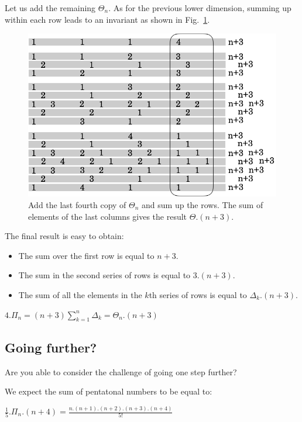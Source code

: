 Let us add the remaining $\Theta_n$.
As for the previous lower dimension, summing up within each row leads to an invariant as shown in Fig.~\ref{fig:Tetrahedral5}.
\begin{figure}[h]
\begin{center}
        \includegraphics[scale=0.36]{FiguresArithmetic/appTetrahedral5}
        \caption{Add the last fourth copy of $\Theta_n$ and sum up the rows. The sum of elements of the last columns gives the result $\Theta.(n+3)$.}
        \label{fig:Tetrahedral5}
\end{center}
\end{figure}
The final result is easy to obtain:
\begin{itemize}
\item 
The sum over the first row is equal to $n+3$.
\item
The sum in the second series of rows is equal to $3.(n+3)$. 
\item
The sum of all the elements in the $k$th series of rows is equal to
$\Delta_k.(n+3)$.
\end{itemize}
$4.\Pi_n = (n+3) \sum_{k=1}^{n} \Delta_k = \Theta_n.(n+3)$


\subsection{Going further?}

Are you able to consider the challenge of going one step further?

We expect the sum of pentatonal numbers to be equal to:

$\frac{1}{5}.\Pi_n.(n+4) = \frac{n.(n+1).(n+2).(n+3).(n+4)}{5!}$


